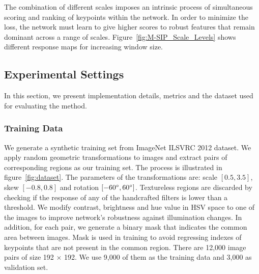 The combination of different scales imposes an intrinsic process of simultaneous scoring and ranking of keypoints within the network. In order to minimize the loss, the network must learn to give higher scores to robust features that remain dominant across a range of scales. Figure~\ref{fig:M-SIP_Scale_Levels} shows different response maps for increasing window size.


\subsection{Experimental Settings}

In this section, we present implementation details, metrics and the dataset used for evaluating the method.

\subsubsection{Training Data}
\label{sec:create_dataset}


We generate a synthetic training set from ImageNet ILSVRC 2012 \cite{RussakovskyDSKSMHKKBBF14} dataset. We apply random geometric transformations to images and extract pairs of corresponding regions as our training set. The process is illustrated in figure~\ref{fig:dataset}. The parameters of the transformations are: scale $[0.5, 3.5]$, skew  $[-0.8, 0.8]$ and rotation $[-60^\circ, 60^\circ]$. Textureless regions are discarded by checking if the response of any of the handcrafted filters is lower than a threshold. We modify contrast, brightness and hue value in HSV space to one of the images to improve network's robustness against illumination changes. In addition, for each pair, we generate a binary mask that indicates the common area between images. Mask is used in training to avoid regressing indexes of keypoints that are not present in the common region. There are 12,000 image pairs of size 192 $\times$ 192. We use 9,000 of them as the training data and 3,000 as validation set.




